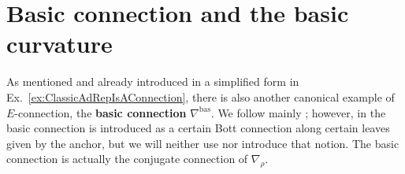\section{Basic connection and the basic curvature}\label{SectionOfBasicConnStuff}

As mentioned and already introduced in a simplified form in Ex.~\ref{ex:ClassicAdRepIsAConnection}, there is also another canonical example of $E$-connection, the \textbf{basic connection} $\nabla^{\text{bas}}$. We follow mainly \cite[\S 2.3]{basicconn}; however, in \cite[\S 3.4]{fernandes} the basic connection is introduced as a certain Bott connection along certain leaves given by the anchor, but we will neither use nor introduce that notion. The basic connection is actually the conjugate connection of $\nabla_\rho$.
%
%
%
